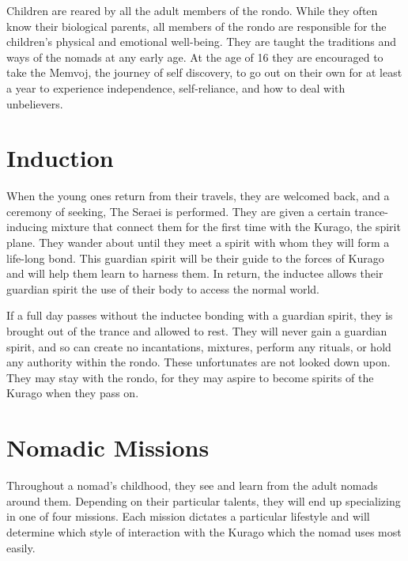 \begin{multicols*}{2}
Children are reared by all the adult members of the rondo. While they often know their biological parents, all members of the rondo are responsible for the children's physical and emotional well-being. They are taught the  traditions and ways of the nomads at any early age. At the age of 16 they are encouraged to take the Memvoj, the journey of self discovery, to go out on their own for at least a year to experience independence, self-reliance, and how to deal with unbelievers.

\section{Induction}

When the young ones return from their travels, they are welcomed back, and a ceremony of seeking, The Seraei is performed. They are given a certain trance-inducing mixture that connect them for the first time with the Kurago, the spirit plane. They wander about until they meet a spirit with whom they will form a life-long bond. This guardian spirit will be their guide to the forces of Kurago and will help them learn to harness them. In return, the inductee allows their guardian spirit the use of their body to access the normal world.

If a full day passes without the inductee bonding with a guardian spirit, they is brought out of the trance and allowed to rest. They will never gain a guardian spirit, and so can create no incantations, mixtures, perform any rituals, or hold any authority within the rondo. These unfortunates are not looked down upon. They may stay with the rondo, for they may aspire to become spirits of the Kurago when they pass on.


\section{Nomadic Missions}

Throughout a nomad's childhood, they see and learn from the adult nomads around them. Depending on their particular talents, they will end up specializing in one of four missions. Each mission dictates a particular lifestyle and will determine which style of interaction with the Kurago which the nomad uses most easily.



\end{multicols*}
